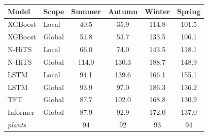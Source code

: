 \begin{tabular}{llcccc}
\toprule
Model & Scope & Summer & Autumn & Winter & Spring \\
\midrule
XGBoost & Local & 40.5 & 35.9 & 114.8 & 101.5 \\
XGBoost & Global & 51.8 & 53.7 & 133.5 & 106.1 \\
N-HiTS & Local & 66.0 & 74.0 & 143.5 & 118.1 \\
N-HiTS & Global & 114.0 & 130.3 & 188.7 & 148.9 \\
LSTM & Local & 94.1 & 139.6 & 166.1 & 155.1 \\
LSTM & Global & 93.9 & 97.0 & 186.3 & 136.2 \\
TFT & Global & 87.7 & 102.0 & 168.8 & 130.9 \\
Informer & Global & 87.9 & 92.9 & 172.0 & 137.0 \\
\midrule
\textit{plants} & & 94 & 92 & 93 & 94 \\
\bottomrule
\end{tabular}
